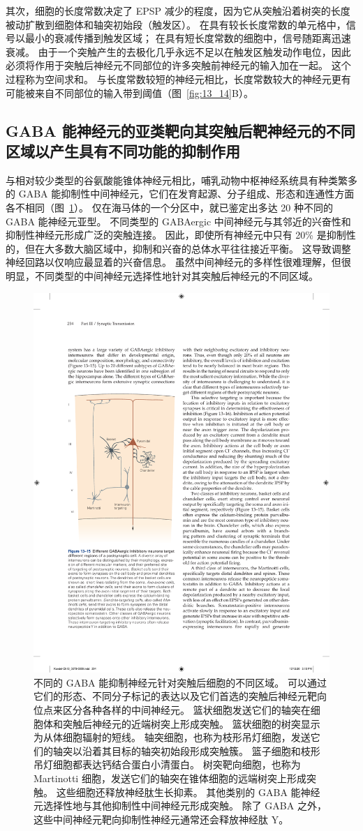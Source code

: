 其次，细胞的长度常数决定了 EPSP 减少的程度，因为它从突触沿着树突的长度被动扩散到细胞体和轴突初始段（触发区）。
在具有较长长度常数的单元格中，信号以最小的衰减传播到触发区域；
在具有短长度常数的细胞中，信号随距离迅速衰减。
由于一个突触产生的去极化几乎永远不足以在触发区触发动作电位，因此必须将作用于突触后神经元不同部位的许多突触前神经元的输入加在一起。
这个过程称为空间求和。
与长度常数较短的神经元相比，长度常数较大的神经元更有可能被来自不同部位的输入带到阈值（图~\ref{fig:13_14}B）。



\subsection{GABA 能神经元的亚类靶向其突触后靶神经元的不同区域以产生具有不同功能的抑制作用}

与相对较少类型的谷氨酸能锥体神经元相比，哺乳动物中枢神经系统具有种类繁多的 GABA 能抑制性中间神经元，它们在发育起源、分子组成、形态和连通性方面各不相同（图~\ref{fig:13_15}）。
仅在海马体的一个分区中，就已鉴定出多达 20 种不同的 GABA 能神经元亚型。
不同类型的 GABAergic 中间神经元与其邻近的兴奋性和抑制性神经元形成广泛的突触连接。
因此，即使所有神经元中只有 20\% 是抑制性的，但在大多数大脑区域中，抑制和兴奋的总体水平往往接近平衡。
这导致调整神经回路以仅响应最显着的兴奋信息。
虽然中间神经元的多样性很难理解，但很明显，不同类型的中间神经元选择性地针对其突触后神经元的不同区域。


\begin{figure}[htbp]
	\centering
	\includegraphics[width=0.5\linewidth]{chap13/fig_13_15}
	\caption{不同的 GABA 能抑制神经元针对突触后细胞的不同区域。 可以通过它们的形态、不同分子标记的表达以及它们首选的突触后神经元靶向位点来区分各种各样的中间神经元。 篮状细胞发送它们的轴突在细胞体和突触后神经元的近端树突上形成突触。 篮状细胞的树突显示为从体细胞辐射的短线。 轴突细胞，也称为枝形吊灯细胞，发送它们的轴突以沿着其目标的轴突初始段形成突触簇。 篮子细胞和枝形吊灯细胞都表达钙结合蛋白小清蛋白。 树突靶向细胞，也称为 Martinotti 细胞，发送它们的轴突在锥体细胞的远端树突上形成突触。 这些细胞还释放神经肽生长抑素。 其他类别的 GABA 能神经元选择性地与其他抑制性中间神经元形成突触。 除了 GABA 之外，这些中间神经元靶向抑制性神经元通常还会释放神经肽 Y。}
	\label{fig:13_15}
\end{figure}


